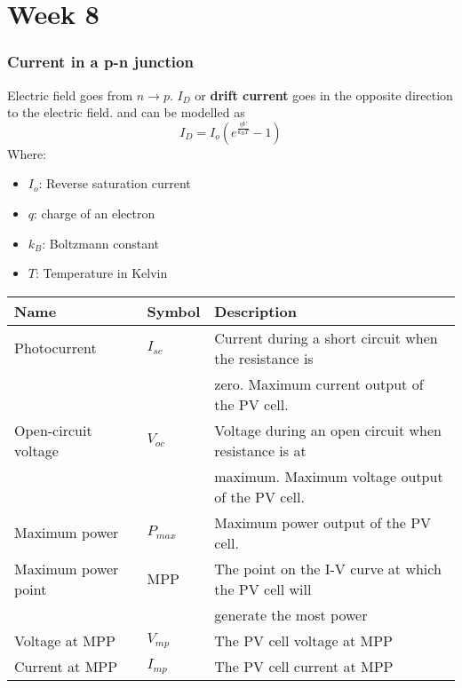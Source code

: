 \documentclass{article}
\begin{document}
\section{Week 8}
\subsubsection{Current in a p-n junction}
Electric field goes from $n \rightarrow p$. $I_{D}$ or \textbf{drift current}
goes in the opposite direction to the electric field. and can be modelled as
\begin{equation}
	I_{D} = I_{o}(e^{\frac{qV}{k_{B}T}}-1)
\end{equation}
Where:
\begin{itemize}
	\item $I_o$: Reverse saturation current
	\item $q$: charge of an electron
	\item $k_{B}$: Boltzmann constant
	\item $T$: Temperature in Kelvin
\end{itemize}
\begin{center}
	\begin{tabular}{l|l|l}
		Name                 & Symbol    & Description                                           \\
		\hline
		Photocurrent         & $I_{sc}$  & Current during a short circuit when the resistance is \\
		                     &           & zero. Maximum current output of the PV cell.          \\
		\hline
		Open-circuit voltage & $V_{oc}$  & Voltage during an open circuit when resistance is at  \\
		                     &           & maximum. Maximum voltage output of the PV cell.       \\
		\hline
		Maximum power        & $P_{max}$ & Maximum power output of the PV cell.                  \\
		\hline
		Maximum power point  & MPP       & The point on the I-V curve at which the PV cell will  \\
		                     &           & generate the most power                               \\
		\hline
		Voltage at MPP       & $V_{mp}$  & The PV cell voltage at MPP                            \\
		\hline
		Current at MPP       & $I_{mp}$  & The PV cell current at MPP                            \\
		\hline
	\end{tabular}
\end{center}
\end{document}
